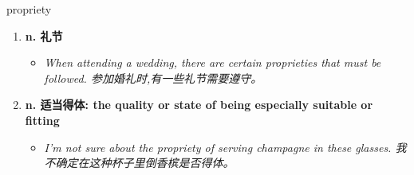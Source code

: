 
\begin{frame}
{\huge propriety}
\begin{center}
\begin{enumerate}\Large
  \item \textbf{n. 礼节}
  \begin{itemize}
    \item \em{\Large{When attending a wedding, there are certain proprieties that must be followed. 参加婚礼时,有一些礼节需要遵守。}}
  \end{itemize}
  \item \textbf{n. 适当得体: the quality or state of being especially suitable or fitting}
  \begin{itemize}
    \item \em{\Large{I'm not sure about the propriety of serving champagne in these glasses. 我不确定在这种杯子里倒香槟是否得体。}}
  \end{itemize}
\end{enumerate}
\end{center}
\end{frame}
